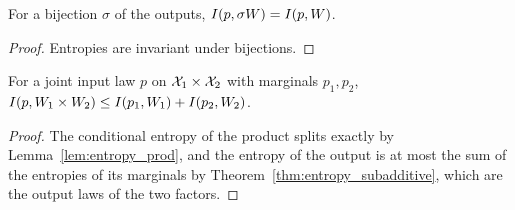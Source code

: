 \begin{theorem}
  \label{thm:mutualInfo_mapOutput}
  \leanok
  For a bijection $\sigma$ of the outputs, $I(p, \sigma W) = I(p, W)$.
\end{theorem}
\begin{proof}
  \leanok
  Entropies are invariant under bijections.
\end{proof}

\begin{theorem}
  \label{thm:mutualInfo_prod_le}
  \leanok
  For a joint input law $p$ on $\mathcal X_1 \times \mathcal X_2$ with marginals $p_1, p_2$,
  $I(p, W_1 \times W_2) \le I(p_1, W_1) + I(p_2, W_2)$.
\end{theorem}
\begin{proof}
  \leanok
  The conditional entropy of the product splits exactly by Lemma~\ref{lem:entropy_prod}, and the
  entropy of the output is at most the sum of the entropies of its marginals by
  Theorem~\ref{thm:entropy_subadditive}, which are the output laws of the two factors.
\end{proof}
